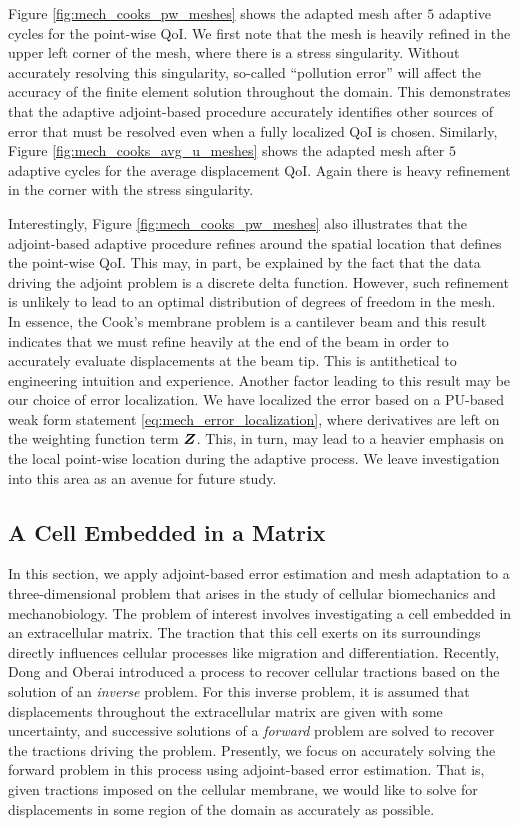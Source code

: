 Figure \ref{fig:mech_cooks_pw_meshes} shows the adapted mesh after $5$
adaptive cycles for the point-wise QoI. We first note that the mesh is
heavily refined in the upper left corner of the mesh, where there is a stress
singularity. Without accurately resolving this singularity, so-called
``pollution error'' \cite{babuvska1994pollution}
will affect the accuracy of the finite element solution
throughout the domain. This demonstrates that the adaptive adjoint-based
procedure accurately identifies other sources of error that must be resolved
even when a fully localized QoI is chosen. Similarly, Figure
\ref{fig:mech_cooks_avg_u_meshes} shows the adapted mesh after $5$
adaptive cycles for the average displacement QoI. Again there is heavy
refinement in the corner with the stress singularity.

Interestingly, Figure \ref{fig:mech_cooks_pw_meshes} also illustrates that
the adjoint-based adaptive procedure refines around the spatial location
that defines the point-wise QoI. This may, in part, be explained by the fact
that the data driving the adjoint problem is a discrete delta function.
However, such refinement is unlikely to lead to an optimal distribution of
degrees of freedom in the mesh. In essence, the Cook's membrane problem
is a cantilever beam and this result indicates that we must refine
heavily at the end of the beam in order to accurately evaluate displacements
at the beam tip. This is antithetical to engineering intuition and
experience. Another factor leading to this result may be our choice of
error localization. We have localized the error based on a PU-based weak
form statement \eqref{eq:mech_error_localization}, where derivatives are left
on the weighting function term $\boldsymbol{Z}$. This, in turn, may lead to a
heavier emphasis on the local point-wise location during the adaptive
process. We leave investigation into this area as an avenue for future
study.

\subsection{A Cell Embedded in a Matrix}

In this section, we apply adjoint-based error estimation and mesh adaptation
to a three-dimensional problem that arises in the study of cellular
biomechanics and mechanobiology. The problem of interest involves
investigating a cell embedded in an extracellular matrix. The traction that
this cell exerts on its surroundings directly influences cellular processes
like migration and differentiation. Recently, Dong and Oberai
\cite{dong2017recovery} introduced a process to recover cellular tractions
based on the solution of an \emph{inverse} problem. For this inverse problem,
it is assumed that displacements throughout the extracellular matrix are given
with some uncertainty, and successive solutions of a \emph{forward} problem are
solved to recover the tractions driving the problem. Presently, we focus on
accurately solving the forward problem in this process using adjoint-based
error estimation. That is, given tractions imposed on the cellular membrane,
we would like to solve for displacements in some region of the domain as
accurately as possible. 

